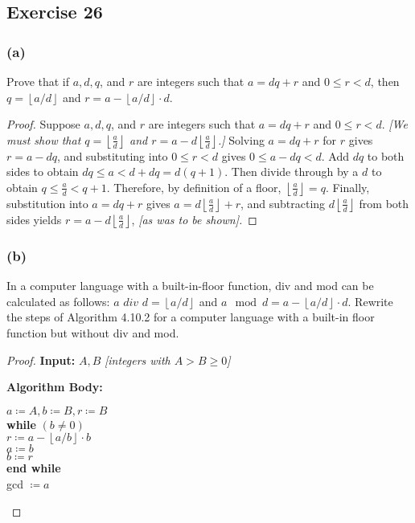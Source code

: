 \documentclass[14pt]{extarticle}
\newcommand{\cy}{\color{cyan}}
\newcommand{\floor}[1]{{\left\lfloor#1\right\rfloor}}
\begin{document}
\subsection{Exercise 26}
\subsubsection{(a)}
Prove that if $a, d, q$, and $r$ are integers such that $a = dq + r$ and $0 \leq r < d$, then $q = \floor{a/d}$ and $r = a - \floor{a/d} \cdot d$.

\begin{proof}
    Suppose $a, d, q$, and $r$ are integers such that $a = dq + r$ and $0 \leq r < d$. {\it [We must show that $q = \floor{\frac{a}{d}}$ and $r = a - d\floor{\frac{a}{d}}$.]} Solving $a = dq + r$ for $r$ gives $r = a - dq$, and substituting into $0 \leq r < d$ gives $0 \leq a - dq < d$. Add $dq$ to both sides to obtain $dq \leq a < d + dq = d(q + 1)$. Then divide through by a $d$ to obtain $q \leq \frac{a}{d} < q + 1$. Therefore, by definition of a floor, $\floor{\frac{a}{d}} = q$. Finally, substitution into $a = dq + r$ gives $a = d \floor{\frac{a}{d}} + r$, and subtracting $d\floor{\frac{a}{d}}$ from both sides yields $r = a - d\floor{\frac{a}{d}}$, {\it [as was to be shown].}
\end{proof}

\subsubsection{(b)}
In a computer language with a built-in-floor function, div and mod can be calculated as follows: $a$ $div$ $d = \floor{a/d}$ and $a \mod d = a - \floor{a/d} \cdot d$. Rewrite the steps of Algorithm 4.10.2 for a computer language with a built-in floor function but without div and mod.

\begin{proof}
    {\bf \cy Input:} $A, B$ {\it [integers with $A > B \geq 0$]}

        {\bf \cy Algorithm Body:}
    \begin{tabbing}
        $a \coloneqq A, b \coloneqq B, r \coloneqq B$ \\
        {\bf whi}\={\bf le} $(b \neq 0)$ \\
        \>$r \coloneqq a - \floor{a/b}\cdot b$ \\
        \>$a \coloneqq b$ \\
        \>$b \coloneqq r$ \\
        {\bf end while} \\
        gcd $\coloneqq a$
    \end{tabbing}
\end{proof}
\end{document}
